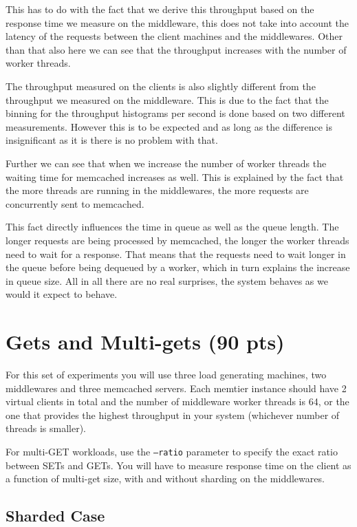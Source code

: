 \documentclass[11pt,a4paper]{article}
\begin{document}
%
This has to do with the fact that we derive this throughput based on the response time we measure on the middleware, this does not take into account the latency of the requests between the client machines and the middlewares.
%
Other than that also here we can see that the throughput increases with the number of worker threads.
%
\par
%
The throughput measured on the clients is also slightly different from the throughput we measured on the middleware. 
%
This is due to the fact that the binning for the throughput histograms per second is done based on two different measurements.
%
However this is to be expected and as long as the difference is insignificant as it is there is no problem with that.
%
\par
%
Further we can see that when we increase the number of worker threads the waiting time for memcached increases as well.
%
This is explained by the fact that the more threads are running in the middlewares, the more requests are concurrently sent to memcached.
%
\par
%
This fact directly influences the time in queue as well as the queue length.
%
The longer requests are being processed by memcached, the longer the worker threads need to wait for a response.
%
That means that the requests need to wait longer in the queue before being dequeued by a worker, which in turn explains the increase in queue size.
%
All in all there are no real surprises, the system behaves as we would it expect to behave.

\section{Gets and Multi-gets (90 pts)}

For this set of experiments you will use three load generating machines, two middlewares and three memcached servers. Each memtier instance should have 2 virtual clients in total and the number of middleware worker threads is 64, or the one that provides the highest throughput in your system (whichever number of threads is smaller).

For multi-GET workloads, use the \texttt{--ratio} parameter to specify the exact ratio between SETs and GETs. You will have to measure response time on the client as a function of multi-get size, with and without sharding on the middlewares.

\subsection{Sharded Case}
\end{document}
